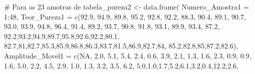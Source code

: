 \documentclass[
  letterpaper,
  DIV=11,
  numbers=noendperiod]{scrartcl}
\newenvironment{Shaded}{\begin{snugshade}}{\end{snugshade}}
\newcommand{\AttributeTok}[1]{\textcolor[rgb]{0.40,0.45,0.13}{#1}}
\newcommand{\CommentTok}[1]{\textcolor[rgb]{0.37,0.37,0.37}{#1}}
\newcommand{\ConstantTok}[1]{\textcolor[rgb]{0.56,0.35,0.01}{#1}}
\newcommand{\DecValTok}[1]{\textcolor[rgb]{0.68,0.00,0.00}{#1}}
\newcommand{\FloatTok}[1]{\textcolor[rgb]{0.68,0.00,0.00}{#1}}
\newcommand{\FunctionTok}[1]{\textcolor[rgb]{0.28,0.35,0.67}{#1}}
\newcommand{\NormalTok}[1]{\textcolor[rgb]{0.00,0.23,0.31}{#1}}
\newcommand{\OtherTok}[1]{\textcolor[rgb]{0.00,0.23,0.31}{#1}}
\newcommand{\SpecialCharTok}[1]{\textcolor[rgb]{0.37,0.37,0.37}{#1}}
\begin{document}
\begin{Shaded}
\begin{Highlighting}[]
\CommentTok{\# Para as 23 amotras de }
\NormalTok{tabela\_pureza2 }\OtherTok{\textless{}{-}} \FunctionTok{data.frame}\NormalTok{(}
  \AttributeTok{Numero\_Amostra1 =} \DecValTok{1}\SpecialCharTok{:}\DecValTok{48}\NormalTok{,}
  \AttributeTok{Teor\_Pureza1 =} \FunctionTok{c}\NormalTok{(}\FloatTok{92.9}\NormalTok{, }\FloatTok{94.9}\NormalTok{, }\FloatTok{89.8}\NormalTok{, }\FloatTok{95.2}\NormalTok{, }\FloatTok{92.8}\NormalTok{, }\FloatTok{92.2}\NormalTok{, }\FloatTok{88.3}\NormalTok{, }\FloatTok{90.4}\NormalTok{, }\FloatTok{89.1}\NormalTok{, }\FloatTok{90.7}\NormalTok{, }
                  \FloatTok{93.0}\NormalTok{, }\FloatTok{93.9}\NormalTok{, }\FloatTok{94.8}\NormalTok{, }\FloatTok{96.4}\NormalTok{, }\FloatTok{91.4}\NormalTok{, }\FloatTok{89.2}\NormalTok{, }\FloatTok{93.7}\NormalTok{, }\FloatTok{90.8}\NormalTok{, }\FloatTok{91.8}\NormalTok{, }\FloatTok{93.1}\NormalTok{, }
                  \FloatTok{89.9}\NormalTok{, }\FloatTok{93.4}\NormalTok{, }\FloatTok{87.2}\NormalTok{, }\FloatTok{92.2}\NormalTok{,}\FloatTok{93.2}\NormalTok{,}\FloatTok{94.9}\NormalTok{,}\FloatTok{89.7}\NormalTok{,}\FloatTok{95.8}\NormalTok{,}\FloatTok{92.6}\NormalTok{,}\FloatTok{92.2}\NormalTok{,}\FloatTok{80.1}\NormalTok{,}
                  \FloatTok{82.7}\NormalTok{,}\DecValTok{81}\NormalTok{,}\FloatTok{82.7}\NormalTok{,}\FloatTok{85.3}\NormalTok{,}\FloatTok{85.9}\NormalTok{,}\FloatTok{86.8}\NormalTok{,}\FloatTok{86.3}\NormalTok{,}\FloatTok{83.7}\NormalTok{,}\FloatTok{81.5}\NormalTok{,}\FloatTok{86.9}\NormalTok{,}\FloatTok{82.7}\NormalTok{,}\DecValTok{84}\NormalTok{,}
                  \FloatTok{85.2}\NormalTok{,}\FloatTok{82.8}\NormalTok{,}\DecValTok{85}\NormalTok{,}\FloatTok{87.2}\NormalTok{,}\FloatTok{82.6}\NormalTok{),}
  \AttributeTok{Amplitude\_Movel1 =} \FunctionTok{c}\NormalTok{(}\ConstantTok{NA}\NormalTok{, }\FloatTok{2.0}\NormalTok{, }\FloatTok{5.1}\NormalTok{, }\FloatTok{5.4}\NormalTok{, }\FloatTok{2.4}\NormalTok{, }\FloatTok{0.6}\NormalTok{, }\FloatTok{3.9}\NormalTok{, }\FloatTok{2.1}\NormalTok{, }\FloatTok{1.3}\NormalTok{, }\FloatTok{1.6}\NormalTok{, }
                      \FloatTok{2.3}\NormalTok{, }\FloatTok{0.9}\NormalTok{, }\FloatTok{0.9}\NormalTok{, }\FloatTok{1.6}\NormalTok{, }\FloatTok{5.0}\NormalTok{, }\FloatTok{2.2}\NormalTok{, }\FloatTok{4.5}\NormalTok{, }\FloatTok{2.9}\NormalTok{, }\FloatTok{1.0}\NormalTok{, }\FloatTok{1.3}\NormalTok{, }
                      \FloatTok{3.2}\NormalTok{, }\FloatTok{3.5}\NormalTok{, }\FloatTok{6.2}\NormalTok{, }\FloatTok{5.0}\NormalTok{,}\FloatTok{1.0}\NormalTok{,}\FloatTok{1.7}\NormalTok{,}\FloatTok{5.2}\NormalTok{,}\FloatTok{6.1}\NormalTok{,}\FloatTok{3.2}\NormalTok{,}\FloatTok{0.4}\NormalTok{,}\FloatTok{12.2}\NormalTok{,}\FloatTok{2.6}\NormalTok{,}

\end{Highlighting}
\end{Shaded}
\end{document}
